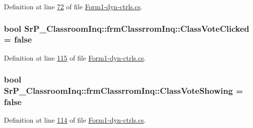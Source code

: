\-Definition at line \hyperlink{_form1-dyn-ctrls_8cs_source_l00072}{72} of file \hyperlink{_form1-dyn-ctrls_8cs_source}{\-Form1-\/dyn-\/ctrls.\-cs}.

\hypertarget{class_sr_p___classroom_inq_1_1frm_classrrom_inq_a1e2c8341b4d2988c61648bea9a4c412b}{
\subsubsection[{\-Class\-Vote\-Clicked}]{\setlength{\rightskip}{0pt plus 5cm}bool {\bf \-Sr\-P\-\_\-\-Classroom\-Inq\-::frm\-Classrrom\-Inq\-::\-Class\-Vote\-Clicked} = false}}
\label{class_sr_p___classroom_inq_1_1frm_classrrom_inq_a1e2c8341b4d2988c61648bea9a4c412b}


\-Definition at line \hyperlink{_form1-dyn-ctrls_8cs_source_l00115}{115} of file \hyperlink{_form1-dyn-ctrls_8cs_source}{\-Form1-\/dyn-\/ctrls.\-cs}.

\hypertarget{class_sr_p___classroom_inq_1_1frm_classrrom_inq_ae23aa3324c19688aa8d35b0217cf9605}{
\subsubsection[{\-Class\-Vote\-Showing}]{\setlength{\rightskip}{0pt plus 5cm}bool {\bf \-Sr\-P\-\_\-\-Classroom\-Inq\-::frm\-Classrrom\-Inq\-::\-Class\-Vote\-Showing} = false}}
\label{class_sr_p___classroom_inq_1_1frm_classrrom_inq_ae23aa3324c19688aa8d35b0217cf9605}


\-Definition at line \hyperlink{_form1-dyn-ctrls_8cs_source_l00114}{114} of file \hyperlink{_form1-dyn-ctrls_8cs_source}{\-Form1-\/dyn-\/ctrls.\-cs}.

